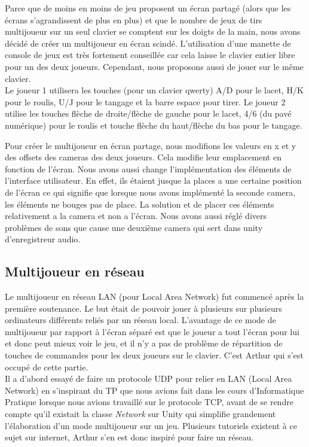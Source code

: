 \documentclass[12pt, titlepage]{article}
\begin{document}
\begin{spacing}{1.5}
Parce que de moins en moins de jeu proposent un écran partagé (alors que les écrans s'agrandissent de plus en plus) et que le nombre de jeux de tirs multijoueur sur un seul clavier se comptent sur les doigts de la main, nous avons décidé de créer un multijoueur en écran scindé. L'utilisation d'une manette de console de jeux est très fortement conseillée car cela laisse le clavier entier libre pour un des deux joueurs. Cependant, nous proposons aussi de jouer sur le même clavier.\\

 Le joueur 1 utilisera les touches (pour un clavier qwerty) A/D pour le lacet, H/K pour le roulis, U/J pour le tangage et la barre espace pour tirer. Le joueur 2 utilise les touches flèche de droite/flèche de gauche pour le lacet, 4/6 (du pavé numérique) pour le roulis et touche flèche du haut/flèche du bas pour le tangage.

Pour créer le multijoueur en écran partage, nous modifions les valeurs en x et y des offsets des cameras des deux joueurs. Cela modifie leur emplacement en fonction de l'écran. Nous avons aussi change l'implémentation des éléments de l'interface utilisateur. En effet, ils étaient jusque la places a une certaine position de l'écran ce qui signifie que lorsque nous avons implémenté la seconde camera, les éléments ne bouges pas de place. La solution et de placer ces éléments relativement a la camera et non a l'écran. Nous avons aussi réglé divers problèmes de sons que cause une deuxième camera qui sert dans unity d'enregistreur audio.\\


\subsection{Multijoueur en réseau}

Le multijoueur en réseau LAN (pour Local Area Network) fut commencé après la première soutenance. Le but était de pouvoir jouer à plusieurs sur plusieurs ordinateurs différents reliés par un réseau local. L'avantage de ce mode de multijoueur par rapport à l'écran séparé est que le joueur a tout l'écran pour lui et donc peut mieux voir le jeu, et il n'y a pas de problème de répartition de touches de commandes pour les deux joueurs sur le clavier. C'est Arthur qui s'est occupé de cette partie.\\

Il a d'abord essayé de faire un protocole UDP pour relier en LAN (Local Area Network) en s'inspirant du TP que nous avions fait dans les cours d'Informatique Pratique lorsque nous avions travaillé sur le protocole TCP, avant de se rendre compte qu'il existait la classe \textit{Network} sur Unity qui simplifie grandement l'élaboration d'un mode multijoueur sur un jeu. Plusieurs tutoriels existent à ce sujet sur internet, Arthur s'en est donc inspiré pour faire un réseau.\\


\end{spacing}
\end{document}
